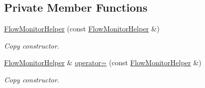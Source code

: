 \subsection*{Private Member Functions}
\begin{DoxyCompactItemize}
\item 
\hyperlink{classns3_1_1FlowMonitorHelper_ac67e61c143d434ece73787a7e9ca4e86}{Flow\+Monitor\+Helper} (const \hyperlink{classns3_1_1FlowMonitorHelper}{Flow\+Monitor\+Helper} \&)
\begin{DoxyCompactList}\small\item\em Copy constructor. \end{DoxyCompactList}\item 
\hyperlink{classns3_1_1FlowMonitorHelper}{Flow\+Monitor\+Helper} \& \hyperlink{classns3_1_1FlowMonitorHelper_a4a38f1e03d3455b89a2b414127aa2dcb}{operator=} (const \hyperlink{classns3_1_1FlowMonitorHelper}{Flow\+Monitor\+Helper} \&)
\begin{DoxyCompactList}\small\item\em Copy constructor. \end{DoxyCompactList}\end{DoxyCompactItemize}
